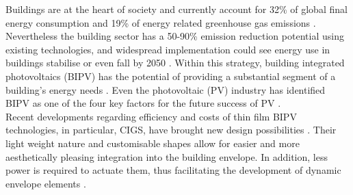 
Buildings are at the heart of society and currently account for 32\% of global final energy consumption and 19\% of energy related greenhouse gas emissions \cite{IPCC}. Nevertheless the building sector has a 50-90\% emission reduction potential using existing technologies, and widespread implementation could see energy use in buildings stabilise or even fall by 2050 \cite{IPCC}. Within this strategy, building integrated photovoltaics (BIPV) has the potential of providing a substantial segment of a building's energy needs \cite{Shoen1997}. Even the photovoltaic (PV) industry has identified BIPV as one of the four key factors for the future success of PV \cite{raugei2009life}. \\

Recent developments regarding efficiency and costs of thin film BIPV technologies, in particular, CIGS, have brought new design possibilities \cite{NREL} \cite{kushiya2014cis} \cite{kaelin2004low} \cite{jelle2012building}. Their light weight nature and customisable shapes allow for easier and more aesthetically pleasing integration into the building envelope. In addition, less power is required to actuate them, thus facilitating the development of dynamic envelope elements \cite{rossi2012adaptive}. \\





